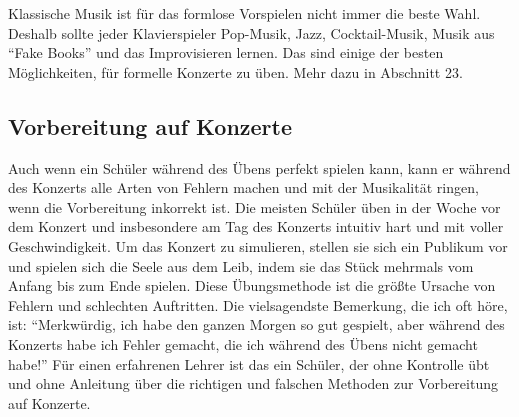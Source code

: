 Klassische Musik ist für das formlose Vorspielen nicht immer die beste Wahl.
Deshalb sollte jeder Klavierspieler Pop-Musik, Jazz, Cocktail-Musik, Musik aus \enquote{Fake Books} und das Improvisieren lernen.
Das sind einige der besten Möglichkeiten, für formelle Konzerte zu üben.
Mehr dazu in Abschnitt 23.


\subsection{Vorbereitung auf Konzerte}\hypertarget{c1iii14f}{}

Auch wenn ein Schüler während des Übens perfekt spielen kann, kann er während des Konzerts alle Arten von Fehlern machen und mit der Musikalität ringen, wenn die Vorbereitung inkorrekt ist.
Die meisten Schüler üben in der Woche vor dem Konzert und insbesondere am Tag des Konzerts intuitiv hart und mit voller Geschwindigkeit.
Um das Konzert zu simulieren, stellen sie sich ein Publikum vor und spielen sich die Seele aus dem Leib, indem sie das Stück mehrmals vom Anfang bis zum Ende spielen.
Diese Übungsmethode ist die größte Ursache von Fehlern und schlechten Auftritten.
Die vielsagendste Bemerkung, die ich oft höre, ist: \enquote{Merkwürdig, ich habe den ganzen Morgen so gut gespielt, aber während des Konzerts habe ich Fehler gemacht, die ich während des Übens nicht gemacht habe!}
Für einen erfahrenen Lehrer ist das ein Schüler, der ohne Kontrolle übt und ohne Anleitung über die richtigen und falschen Methoden zur Vorbereitung auf Konzerte.

